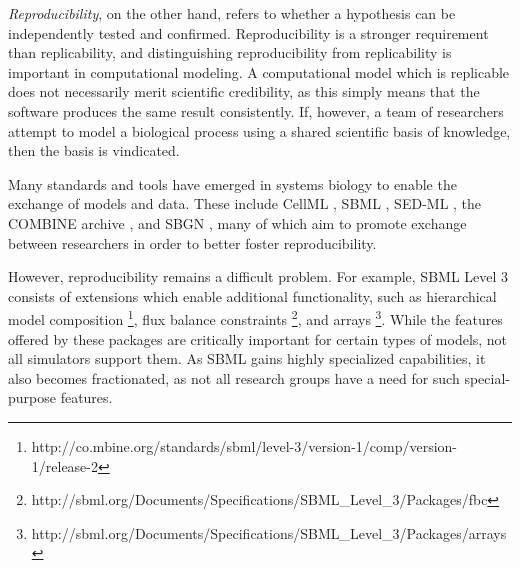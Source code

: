 \documentclass[journal,transmag]{IEEEtran}
\begin{document}
\textit{Reproducibility}, on the other hand, refers to whether a hypothesis can be
independently tested and confirmed.
Reproducibility is a stronger requirement than replicability, and distinguishing reproducibility
from replicability is important in computational modeling.
A computational model which is replicable does not necessarily merit scientific credibility,
as this simply means that the software produces the same result consistently.
If, however, a team of researchers attempt to model a biological process using
a shared scientific basis of knowledge, then the basis is vindicated.


Many standards and tools have emerged in systems biology to enable the exchange of models and data.
These include
CellML \cite{cuellar2003overview}, SBML \cite{hucka2003}, SED-ML \cite{sedml2011}, the COMBINE archive \cite{COMBINE2012}, and SBGN \cite{LeNovereHMMSS09},
many of which aim to promote exchange between researchers in order to better foster reproducibility.

However, reproducibility remains a difficult problem.
For example, SBML Level 3 consists of extensions which enable additional
functionality, such as
hierarchical model composition \footnote{http://co.mbine.org/standards/sbml/level-3/version-1/comp/version-1/release-2},
flux balance constraints \footnote{ http://sbml.org/Documents/Specifications/SBML\_Level\_3/Packages/fbc}, and
arrays \footnote{http://sbml.org/Documents/Specifications/SBML\_Level\_3/Packages/arrays}.
While the features offered by these packages are critically important for certain
types of models, not all simulators support them.
As SBML gains highly specialized capabilities, it also becomes fractionated, as
not all research groups have a need for such special-purpose features.


\end{document}
